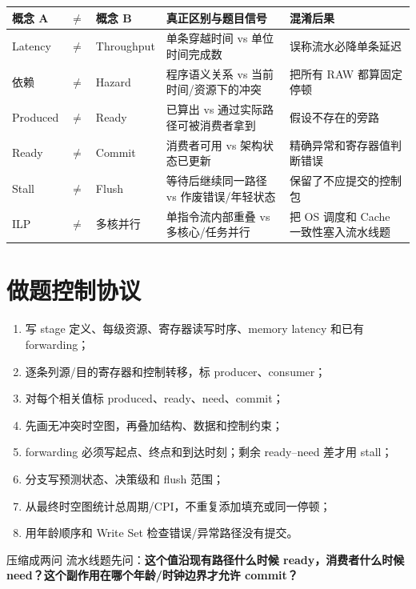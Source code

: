 \documentclass[UTF8,fontset=fandol,11pt,a4paper]{ctexart}
\newcommand{\kw}[1]{\textbf{\color{deep}#1}}
\begin{document}
\begin{center}
\small
\begin{tabularx}{\linewidth}{L{1.8cm}C{0.35cm}L{1.8cm}Y Y}
\toprule
概念 A & $\neq$ & 概念 B & 真正区别与题目信号 & 混淆后果\\
\midrule
Latency & $\neq$ & Throughput & 单条穿越时间 vs 单位时间完成数 & 误称流水必降单条延迟\\
依赖 & $\neq$ & Hazard & 程序语义关系 vs 当前时间/资源下的冲突 & 把所有 RAW 都算固定停顿\\
Produced & $\neq$ & Ready & 已算出 vs 通过实际路径可被消费者拿到 & 假设不存在的旁路\\
Ready & $\neq$ & Commit & 消费者可用 vs 架构状态已更新 & 精确异常和寄存器值判断错误\\
Stall & $\neq$ & Flush & 等待后继续同一路径 vs 作废错误/年轻状态 & 保留了不应提交的控制包\\
ILP & $\neq$ & 多核并行 & 单指令流内部重叠 vs 多核心/任务并行 & 把 OS 调度和 Cache 一致性塞入流水线题\\
\bottomrule
\end{tabularx}
\end{center}

\section{做题控制协议}

\begin{enumerate}
  \item 写 stage 定义、每级资源、寄存器读写时序、memory latency 和已有 forwarding；
  \item 逐条列源/目的寄存器和控制转移，标 producer、consumer；
  \item 对每个相关值标 produced、ready、need、commit；
  \item 先画无冲突时空图，再叠加结构、数据和控制约束；
  \item forwarding 必须写起点、终点和到达时刻；剩余 ready--need 差才用 stall；
  \item 分支写预测状态、决策级和 flush 范围；
  \item 从最终时空图统计总周期/CPI，不重复添加填充或同一停顿；
  \item 用年龄顺序和 Write Set 检查错误/异常路径没有提交。
\end{enumerate}

\begin{methodbox}{压缩成两问}
流水线题先问：\kw{这个值沿现有路径什么时候 ready，消费者什么时候 need？这个副作用在哪个年龄/时钟边界才允许 commit？}
\end{methodbox}
\end{document}

